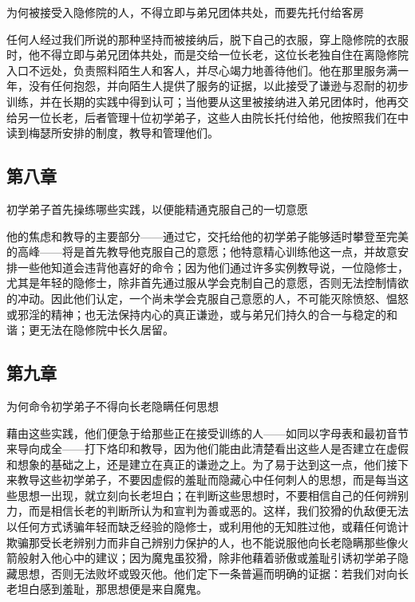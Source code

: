 为何被接受入隐修院的人，不得立即与弟兄团体共处，而要先托付给客房\par

任何人经过我们所说的那种坚持而被接纳后，脱下自己的衣服，穿上隐修院的衣服时，他不得立即与弟兄团体共处，而是交给一位长老，这位长老独自住在离隐修院入口不远处，负责照料陌生人和客人，并尽心竭力地善待他们。他在那里服务满一年，没有任何抱怨，并向陌生人提供了服务的证据，以此接受了谦逊与忍耐的初步训练，并在长期的实践中得到认可；当他要从这里被接纳进入弟兄团体时，他再交给另一位长老，后者管理十位初学弟子，这些人由院长托付给他，他按照我们在中读到梅瑟所安排的制度，教导和管理他们。\par


\subsection{第八章}

初学弟子首先操练哪些实践，以便能精通克服自己的一切意愿\par

他的焦虑和教导的主要部分——通过它，交托给他的初学弟子能够适时攀登至完美的高峰——将是首先教导他克服自己的意愿；他特意精心训练他这一点，并故意安排一些他知道会违背他喜好的命令；因为他们通过许多实例教导说，一位隐修士，尤其是年轻的隐修士，除非首先通过服从学会克制自己的意愿，否则无法控制情欲的冲动。因此他们认定，一个尚未学会克服自己意愿的人，不可能灭除愤怒、愠怒或邪淫的精神；也无法保持内心的真正谦逊，或与弟兄们持久的合一与稳定的和谐；更无法在隐修院中长久居留。\par


\subsection{第九章}

为何命令初学弟子不得向长老隐瞒任何思想\par

藉由这些实践，他们便急于给那些正在接受训练的人——如同以字母表和最初音节来导向成全——打下烙印和教导，因为他们能由此清楚看出这些人是否建立在虚假和想象的基础之上，还是建立在真正的谦逊之上。为了易于达到这一点，他们接下来教导这些初学弟子，不要因虚假的羞耻而隐藏心中任何刺人的思想，而是每当这些思想一出现，就立刻向长老坦白；在判断这些思想时，不要相信自己的任何辨别力，而是相信长老的判断所认为和宣判为善或恶的。这样，我们狡猾的仇敌便无法以任何方式诱骗年轻而缺乏经验的隐修士，或利用他的无知胜过他，或藉任何诡计欺骗那受长老辨别力而非自己辨别力保护的人，也不能说服他向长老隐瞒那些像火箭般射入他心中的建议；因为魔鬼虽狡猾，除非他藉着骄傲或羞耻引诱初学弟子隐藏思想，否则无法败坏或毁灭他。他们定下一条普遍而明确的证据：若我们对向长老坦白感到羞耻，那思想便是来自魔鬼。\par

